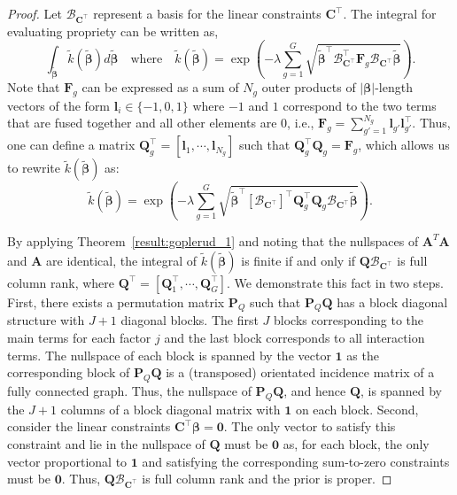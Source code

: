 \begin{proof}
  Let $\mathcal{B}_{\bm{C}^\top}$ represent a basis for the
  linear constraints $\bm{C}^\top$. The integral for evaluating
  propriety can be written as,
  \begin{equation*}
\int_{\tilde{\bm{\beta}}} \tilde{k}(\tilde{\bm{\beta}})
d\tilde{\bm{\beta}}\quad \text{where} \quad \tilde{k}(\tilde{\bm{\beta}}) =
\exp\left(-\lambda \sum_{g=1}^G
  \sqrt{\tilde{\bm{\beta}}^\top\mathcal{B}_{\bm{C}^\top}^\top \bm{F}_g
    \mathcal{B}_{\bm{C}^\top} \tilde{\bm{\beta}}}\right). 
\end{equation*}
Note that $\bm{F}_g$ can be expressed as a sum of $N_g$ outer products
of $|\bm{\beta}|$-length vectors of the form
$\bm{l}_i \in \{-1, 0, 1\}$ where $-1$ and $1$ correspond to the two
terms that are fused together and all other elements are $0$, i.e.,
$ \bm{F}_g = \sum_{g'=1}^{N_g} \bm{l}_{g'}\bm{l}_{g'}^\top$. Thus, one
can define a matrix
$\bm{Q}_g^\top = \left[\bm{l}_1, \cdots, \bm{l}_{N_g}\right]$ such
that $\bm{Q}_g^\top \bm{Q}_g = \bm{F}_g$, which allows us to rewrite
$\tilde{k}(\tilde{\bm{\beta}})$ as:
$$\tilde{k}(\tilde{\bm{\beta}}) = \exp\left(-\lambda \sum_{g=1}^G
  \sqrt{\tilde{\bm{\beta}}^\top
    \left[\mathcal{B}_{\bm{C}^\top}\right]^\top \bm{Q}_g^\top \bm{Q}_g
    \mathcal{B}_{\bm{C}^\top} \tilde{\bm{\beta}}}\right).$$

By applying Theorem~\ref{result:goplerud_1} and noting that the
nullspaces of $\bm{A}^T\bm{A}$ and $\bm{A}$ are identical, the
integral of $\tilde{k}(\tilde{\bm{\beta}})$ is finite if and only if
$\bm{Q}\mathcal{B}_{\bm{C}^\top}$ is full column rank, where
$\bm{Q}^\top = [\bm{Q}^\top_1, \cdots, \bm{Q}^\top_G]$.  We
demonstrate this fact in two steps.  First, there exists a permutation
matrix $\bm{P}_{Q}$ such that $\bm{P}_Q \bm{Q} $ has a block diagonal
structure with $J+1$ diagonal blocks. The first $J$ blocks
corresponding to the main terms for each factor $j$ and the last block
corresponds to all interaction terms. The nullspace of each block is
spanned by the vector $\bm{1}$ as the corresponding block of
$\bm{P}_Q\bm{Q}$ is a (transposed) orientated incidence matrix of a
fully connected graph. Thus, the nullspace of $\bm{P}_Q \bm{Q}$, and
hence $\bm{Q}$, is spanned by the $J+1$ columns of a block diagonal
matrix with $\bm{1}$ on each block.  Second, consider the linear
constraints $\bm{C}^\top \bm{\beta} = \bm{0}$.  The only vector to
satisfy this constraint and lie in the nullspace of $\bm{Q}$ must be
$\bm{0}$ as, for each block, the only vector proportional to $\bm{1}$
and satisfying the corresponding sum-to-zero constraints must be
$\bm{0}$. Thus, $\bm{Q}\mathcal{B}_{\bm{C}^\top}$ is full column rank
and the prior is proper.
\end{proof}

